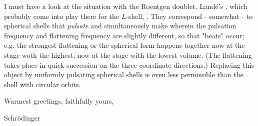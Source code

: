 \begin{letter}{9}
I must have a look at the situation with the Roentgen doublet. Land\'e's , which probably come into play there for the $L$-shell, . They correspond - somewhat - to spherical shells that \textit{pulsate} and simultaneously make  wherein the pulsation frequency and flattening frequency are slightly different, so that "beats" occur; e.g. the strongest flattening or the spherical form happens together now at the stage woth the highest, now at the stage with the lowest volume. (The flattening takes place in quick succession on the three coordinate directions.) Replacing this object by uniformly pulsating spherical shells is even less permissible than the shell with circular orbits. 

Warmest greetings, faithfully yours,

Schr\"odinger

\end{letter}